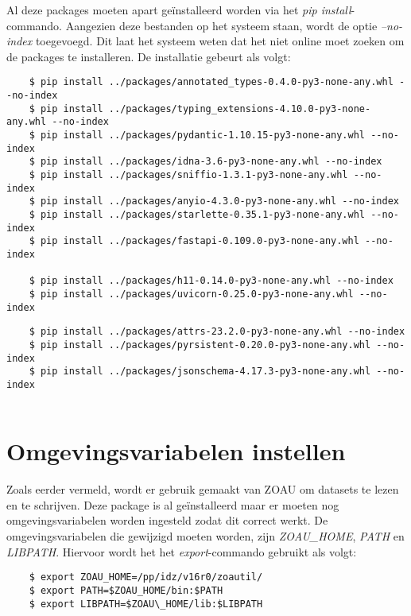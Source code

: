 Al deze packages moeten apart geïnstalleerd worden via het \textit{pip install}-commando. Aangezien deze bestanden op het systeem staan, wordt de optie \textit{--no-index} toegevoegd. Dit laat het systeem weten dat het niet online moet zoeken om de packages te installeren. De installatie gebeurt als volgt:\\
\begin{lstlisting}
    $ pip install ../packages/annotated_types-0.4.0-py3-none-any.whl --no-index
    $ pip install ../packages/typing_extensions-4.10.0-py3-none-any.whl --no-index
    $ pip install ../packages/pydantic-1.10.15-py3-none-any.whl --no-index
    $ pip install ../packages/idna-3.6-py3-none-any.whl --no-index
    $ pip install ../packages/sniffio-1.3.1-py3-none-any.whl --no-index
    $ pip install ../packages/anyio-4.3.0-py3-none-any.whl --no-index
    $ pip install ../packages/starlette-0.35.1-py3-none-any.whl --no-index
    $ pip install ../packages/fastapi-0.109.0-py3-none-any.whl --no-index
    
    $ pip install ../packages/h11-0.14.0-py3-none-any.whl --no-index
    $ pip install ../packages/uvicorn-0.25.0-py3-none-any.whl --no-index
\end{lstlisting}

\begin{lstlisting}
    $ pip install ../packages/attrs-23.2.0-py3-none-any.whl --no-index
    $ pip install ../packages/pyrsistent-0.20.0-py3-none-any.whl --no-index
    $ pip install ../packages/jsonschema-4.17.3-py3-none-any.whl --no-index
    
\end{lstlisting}

\section{Omgevingsvariabelen instellen}
Zoals eerder vermeld, wordt er gebruik gemaakt van ZOAU om datasets te lezen en te schrijven. Deze package is al geïnstalleerd maar er moeten nog omgevingsvariabelen worden ingesteld zodat dit correct werkt. De omgevingsvariabelen die gewijzigd moeten worden, zijn \textit{ZOAU\_HOME}, \textit{PATH} en \textit{LIBPATH}. Hiervoor wordt het het \textit{export}-commando gebruikt als volgt: \\

\begin{lstlisting}
    $ export ZOAU_HOME=/pp/idz/v16r0/zoautil/
    $ export PATH=$ZOAU_HOME/bin:$PATH
    $ export LIBPATH=$ZOAU\_HOME/lib:$LIBPATH
    
\end{lstlisting}

